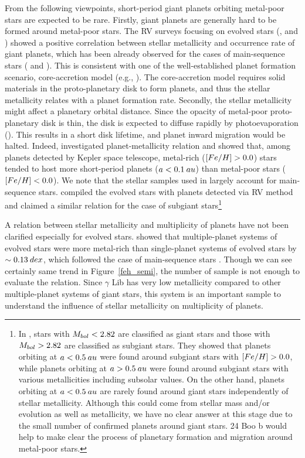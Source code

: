 \documentclass[]{pasj01}
\begin{document}
From the following viewpoints, short-period giant planets orbiting metal-poor stars are expected to be rare.
Firstly, giant planets are generally hard to be formed around metal-poor stars.
The RV surveys focusing on evolved stars (\cite{Reffert2015}, \cite{Jones2016} and \cite{Wittenmyer2017}) showed a positive correlation between stellar metallicity and occurrence rate of giant planets, 
which has been already observed for the cases of main-sequence stars (\cite{Fischer2005} and \cite{Udry2007}).
This is consistent with one of the well-established planet formation scenario, core-accretion model (e.g., \cite{Pollack1996}).
The core-accretion model requires solid materials in the proto-planetary disk to form planets, and thus the stellar metallicity relates with a planet formation rate.
Secondly, the stellar metallicity might affect a planetary orbital distance.
Since the opacity of metal-poor proto-planetary disk is thin, the disk is expected to diffuse rapidly by photoevaporation (\cite{Ercolano2010}).
This results in a short disk lifetime, and planet inward migration would be halted.
Indeed, \citet{Dawson2013} investigated planet-metallicity relation and showed that, among planets detected by Kepler space telescope, metal-rich (${\rm [Fe/H]}>0.0$) stars tended to host more short-period planets ($a<0.1\>{\rm au}$) than metal-poor stars (${\rm [Fe/H]}<0.0$).
We note that the stellar samples used in \citet{Dawson2013} largely account for main-sequence stars.
\citet{Jofre2015} compiled the evolved stars with planets detected via RV method and claimed a similar relation for the case of subgiant stars\footnote{In \citet{Jofre2015}, stars with $M_{\rm bol}<2.82$ are classified as giant stars and those with $M_{\rm bol}>2.82$ are classified as subgiant stars.
They showed that planets orbiting at $a<0.5\>{\rm au}$ were found around subgiant stars with ${\rm [Fe/H]}>0.0$, while planets orbiting at $a>0.5\>{\rm au}$ were found around subgiant stars with various metallicities including subsolar values.
On the other hand, planets orbiting at $a<0.5\>{\rm au}$ are rarely found around giant stars independently of stellar metallicity.
Although this could come from stellar mass and/or evolution as well as metallicity, we have no clear answer at this stage due to the small number of confirmed planets around giant stars.
24 Boo b would help to make clear the process of planetary formation and migration around metal-poor stars.}

A relation between stellar metallicity and multiplicity of planets have not been clarified especially for evolved stars.
\citet{Jofre2015} showed that multiple-planet systems of evolved stars were more metal-rich than single-planet systems of evolved stars by $\sim0.13\>{\rm dex}$, which followed the case of main-sequence stars \citep{Wright2009}.
Though we can see certainly same trend in Figure~\ref{feh_semi}, the number of sample is not enough to evaluate the relation.
Since $\gamma$ Lib has very low metallicity compared to other multiple-planet systems of giant stars, this system is an important sample to understand the influence of stellar metallicity on multiplicity of planets.
\end{document}
